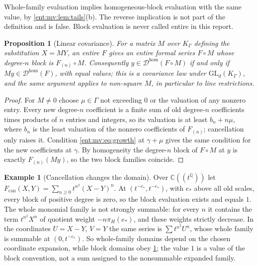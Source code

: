 \documentclass[11pt]{article}
\theoremstyle{plain}
\theoremstyle{plain}
\newtheorem{proposition}[proposition]{Proposition}
\theoremstyle{plain}
\theoremstyle{definition}
\theoremstyle{definition}
\theoremstyle{definition}
\newtheorem{example}[example]{Example}
\theoremstyle{definition}
\theoremstyle{remark}
\newcommand{\C}{\mathbb C}\newcommand{\R}{\mathbb R}
\newcommand{\Q}{\mathbb Q}\newcommand{\Z}{\mathbb Z}\newcommand{\N}{\mathbb N}
\newcommand{\K}{K_\Gamma}\newcommand{\KD}{K_\Delta}
\begin{document}
Whole-family evaluation implies homogeneous-block evaluation with the same
value, by \cref{ent:mv:lem:tails}(b). The reverse implication is not part of
the definition and is false. Block evaluation is never called entire in this
report.

\begin{proposition}[Linear covariance]\label{ent:mv:prop:linear}
For a matrix $M$ over $\K$ defining the substitution $X=MY$, an entire $F$
gives an entire formal series $F\circ M$ whose degree-$n$ block is
$F_{(n)}\circ M$. Consequently $y\in\mathcal D^{\mathrm{hom}}(F\circ M)$ if and
only if $My\in\mathcal D^{\mathrm{hom}}(F)$, with equal values; this is a
covariance law under $\mathrm{GL}_d(\K)$, and the same argument applies to
non-square $M$, in particular to line restrictions.
\end{proposition}
\begin{proof}
For $M\ne0$ choose $\mu\in\Gamma$ not exceeding $0$ or the valuation of any
nonzero entry. Every new degree-$n$ coefficient is a finite sum of old
degree-$n$ coefficients times products of $n$ entries and integers, so its
valuation is at least $b_n+n\mu$, where $b_n$ is the least valuation of the
nonzero coefficients of $F_{(n)}$; cancellation only raises it. Condition
\eqref{ent:mv:eq:growth} at $\gamma+\mu$ gives the same condition for the new
coefficients at $\gamma$. By homogeneity the degree-$n$ block of $F\circ M$
at $y$ is exactly $F_{(n)}(My)$, so the two block families coincide.
\end{proof}

\begin{example}[Cancellation changes the domain]\label{ent:mv:ex:cancel}
Over $\C((t^\Q))$ let $F_{\mathrm{can}}(X,Y)=\sum_{n\ge0}t^{n^2}(X-Y)^n$. At
$(t^{-e_*},t^{-e_*})$, with $e_*$ above all old scales, every block of
positive degree is zero, so the block evaluation exists and equals $1$. The
whole monomial family is not strongly summable: for every $n$ it contains the
term $t^{n^2}X^n$ of quotient weight $-n\pi_H(e_*)$, and these weights
strictly decrease. In the coordinates $U=X-Y$, $V=Y$ the same series is
$\sum t^{n^2}U^n$, whose whole family is summable at $(0,t^{-e_*})$. So
whole-family domains depend on the chosen coordinate expansion, while block
domains obey \cref{ent:mv:prop:linear}; the value $1$ is a value of the block
convention, not a sum assigned to the nonsummable expanded family.
\end{example}
\end{document}
